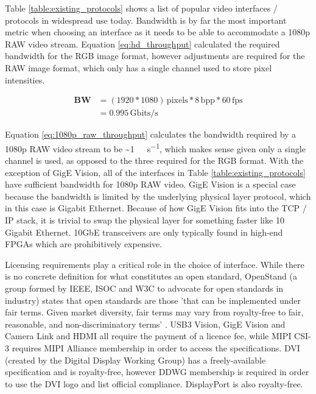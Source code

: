 Table \ref{table:existing_protocols} shows a list of popular video interfaces / protocols in widespread use today. Bandwidth is by far the most important metric when choosing an interface as it needs to be able to accommodate a 1080p RAW video stream. Equation \ref{eq:hd_throughput} calculated the required bandwidth for the RGB image format, however adjustments are required for the RAW image format, which only has a single channel used to store pixel intensities. 

\begin{equation}
  \begin{split}
    \mathbf{BW} &= (1920*1080) \, \mathrm{pixels} * 8  \, \mathrm{bpp} * 60 \, \mathrm{fps} \\
                &= 0.995  \, \mathrm{Gbits/s}
  \end{split}  
  \label{eq:1080p_raw_throughput}
\end{equation}

Equation \ref{eq:1080p_raw_throughput} calculates the bandwidth required by a 1080p RAW video stream to be \SI{~1}{\giga\bit\per\second}, which makes sense given only a single channel is used, as opposed to the three required for the RGB format. With the exception of GigE Vision, all of the interfaces in Table \ref{table:existing_protocols} have sufficient bandwidth for 1080p RAW video. GigE Vision is a special case because the bandwidth is limited by the underlying physical layer protocol, which in this case is Gigabit Ethernet. Because of how GigE Vision fits into the TCP / IP stack, it is trivial to swap the physical layer for something faster like 10 Gigabit Ethernet. 10GbE transceivers are only typically found in high-end FPGAs which are prohibitively expensive.

Licensing requirements play a critical role in the choice of interface. While there is no concrete definition for what constitutes an open standard, OpenStand (a group formed by IEEE, ISOC and W3C to advocate for open standards in industry) states that open standards are those 'that can be implemented under fair terms. Given market diversity, fair terms may vary from royalty-free to fair, reasonable, and non-discriminatory terms' \cite{open_standard_definition}. USB3 Vision, GigE Vision and Camera Link and HDMI all require the payment of a licence fee, while MIPI CSI-3 requires MIPI Alliance membership in order to access the specifications. DVI (created by the Digital Display Working Group) has a freely-available specification and is royalty-free, however DDWG membership is required in order to use the DVI logo and list official compliance. DisplayPort is also royalty-free.